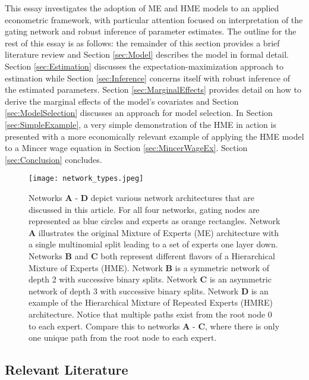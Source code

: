\documentclass[12pt]{article}
\theoremstyle{definition}
\begin{document}
\bigskip

This essay investigates the adoption of ME and HME models to an applied
econometric framework, with particular attention focused on interpretation of
the gating network and robust inference of parameter estimates. The outline for the
rest of this essay is as follows: the remainder of this section
provides a brief literature review and Section \ref{sec:Model} describes
the model in formal detail. Section \ref{sec:Estimation} discusses the
expectation-maximization approach to estimation while Section \ref{sec:Inference}
concerns itself with robust inference of the estimated parameters.
Section \ref{sec:MarginalEffects} provides detail on how to derive the
marginal effects of the model's covariates and Section \ref{sec:ModelSelection}
discusses an approach for model selection. In Section \ref{sec:SimpleExample},
a very simple demonstration of the HME in action is presented with 
a more economically relevant example of applying the HME model to
a Mincer wage equation in Section \ref{sec:MincerWageEx}. Section
\ref{sec:Conclusion} concludes.

\begin{figure}[!ht]
  \centering
  \texttt{[image: network\_types.jpeg]}
  \caption{Networks \textbf{A} - \textbf{D} depict various network
  architectures that are discussed in this article. For all four networks,
  gating nodes are represented as blue circles and experts as orange
  rectangles. Network \textbf{A} illustrates the original Mixture of
  Experts (ME) architecture with a single multinomial split leading
  to a set of experts one layer down. Networks \textbf{B} and \textbf{C} both
  represent different flavors of a Hierarchical Mixture of Experts (HME). Network
  \textbf{B} is a symmetric network of depth 2 with successive binary splits.
  Network \textbf{C} is an asymmetric network of depth 3 with successive
  binary splits. Network \textbf{D} is an example of the Hierarchical
  Mixture of Repeated Experts (HMRE) architecture. Notice that multiple paths
  exist from the root node $0$ to each expert. Compare this to networks
  \textbf{A} - \textbf{C}, where there is only one unique path from the root
  node to each expert.}
  \label{fig:network_comparison}
\end{figure}


\subsection{Relevant Literature}
\end{document}
